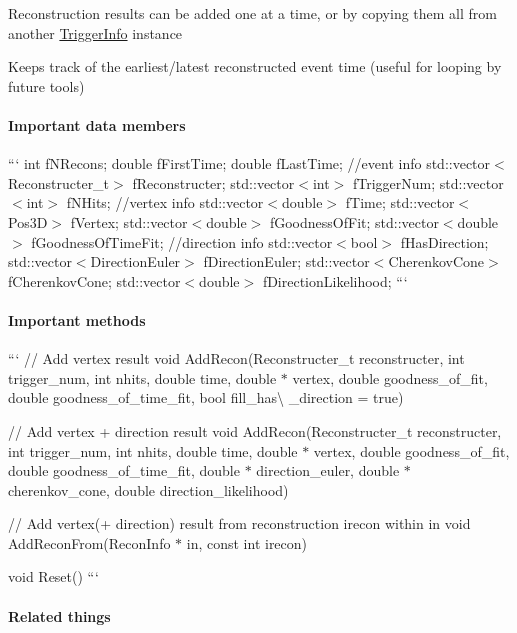 Reconstruction results can be added one at a time, or by copying them all from another {\ttfamily \hyperlink{classTriggerInfo}{Trigger\-Info}} instance

Keeps track of the earliest/latest reconstructed event time (useful for looping by future tools)

\paragraph*{Important data members}

``` int f\-N\-Recons; double f\-First\-Time; double f\-Last\-Time; //event info std\-::vector$<$\-Reconstructer\-\_\-t$>$ f\-Reconstructer; std\-::vector$<$int$>$ f\-Trigger\-Num; std\-::vector$<$int$>$ f\-N\-Hits; //vertex info std\-::vector$<$double$>$ f\-Time; std\-::vector$<$\-Pos3\-D$>$ f\-Vertex; std\-::vector$<$double$>$ f\-Goodness\-Of\-Fit; std\-::vector$<$double$>$ f\-Goodness\-Of\-Time\-Fit; //direction info std\-::vector$<$bool$>$ f\-Has\-Direction; std\-::vector$<$\-Direction\-Euler$>$ f\-Direction\-Euler; std\-::vector$<$\-Cherenkov\-Cone$>$ f\-Cherenkov\-Cone; std\-::vector$<$double$>$ f\-Direction\-Likelihood; ```

\paragraph*{Important methods}

``` // Add vertex result void Add\-Recon(Reconstructer\-\_\-t reconstructer, int trigger\-\_\-num, int nhits, double time, double $\ast$ vertex, double goodness\-\_\-of\-\_\-fit, double goodness\-\_\-of\-\_\-time\-\_\-fit, bool fill\-\_\-has\textbackslash{} \-\_\-direction = true)

// Add vertex + direction result void Add\-Recon(Reconstructer\-\_\-t reconstructer, int trigger\-\_\-num, int nhits, double time, double $\ast$ vertex, double goodness\-\_\-of\-\_\-fit, double goodness\-\_\-of\-\_\-time\-\_\-fit, double $\ast$ direction\-\_\-euler, double $\ast$ cherenkov\-\_\-cone, double direction\-\_\-likelihood)

// Add vertex(+ direction) result from reconstruction irecon within in void Add\-Recon\-From(\-Recon\-Info $\ast$ in, const int irecon)

void Reset() ```

\paragraph*{Related things}


